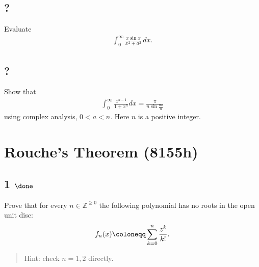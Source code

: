 \hypertarget{section-13}{%
\subsection{?}\label{section-13}}

Evaluate
\begin{align*}
\displaystyle{ \int_{0}^{\infty}\frac{x\sin x}{x^2+a^2} \, dx }
.\end{align*}

\hypertarget{section-14}{%
\subsection{?}\label{section-14}}

Show that
\begin{align*}
\displaystyle \int_0^\infty \frac{x^{a-1}}{1+x^n} dx=\frac{\pi}{n\sin \frac{a\pi}{n}}
\end{align*}
using complex analysis, \(0< a < n\). Here \(n\) is a positive integer.

\hypertarget{rouches-theorem-8155h}{%
\section{Rouche's Theorem (8155h)}\label{rouches-theorem-8155h}}

\hypertarget{done-8}{%
\subsection{\texorpdfstring{1
\(\done\)}{1 \textbackslash done}}\label{done-8}}

Prove that for every \(n\in {\mathbb{Z}}^{\geq 0}\) the following
polynomial has no roots in the open unit disc:
\begin{align*}
f_n(x) \coloneqq\sum_{k=0}^n {z^k \over k!}
.\end{align*}

\begin{quote}
Hint: check \(n=1,2\) directly.
\end{quote}

